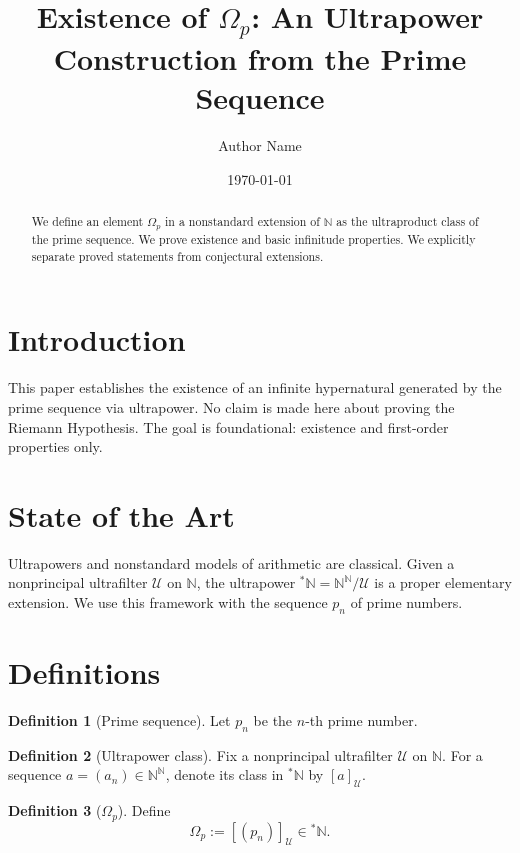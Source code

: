\documentclass[11pt]{article}
\title{Existence of \(\Omega_p\): An Ultrapower Construction from the Prime Sequence}
\author{Author Name}
\date{\today}
\theoremstyle{definition}
\newtheorem{definition}{Definition}[section]
\theoremstyle{plain}
\begin{document}
\maketitle

\begin{abstract}
We define an element \(\Omega_p\) in a nonstandard extension of \(\mathbb N\) as the ultraproduct class of the prime sequence.
We prove existence and basic infinitude properties.
We explicitly separate proved statements from conjectural extensions.
\end{abstract}

\section{Introduction}
This paper establishes the existence of an infinite hypernatural generated by the prime sequence via ultrapower.
No claim is made here about proving the Riemann Hypothesis.
The goal is foundational: existence and first-order properties only.

\section{State of the Art}
Ultrapowers and nonstandard models of arithmetic are classical.
Given a nonprincipal ultrafilter \(\mathcal U\) on \(\mathbb N\), the ultrapower \({}^\ast\mathbb N=\mathbb N^{\mathbb N}/\mathcal U\) is a proper elementary extension.
We use this framework with the sequence \(p_n\) of prime numbers.

\section{Definitions}
\begin{definition}[Prime sequence]
\label{def:prime-seq}
Let \(p_n\) be the \(n\)-th prime number.
\end{definition}

\begin{definition}[Ultrapower class]
\label{def:ultrapower-class}
Fix a nonprincipal ultrafilter \(\mathcal U\) on \(\mathbb N\).
For a sequence \(a=(a_n)\in\mathbb N^{\mathbb N}\), denote its class in \({}^\ast\mathbb N\) by \([a]_{\mathcal U}\).
\end{definition}

\begin{definition}[\(\Omega_p\)]
\label{def:omega-p}
Define
\[
\Omega_p := [(p_n)]_{\mathcal U}\in {}^\ast\mathbb N.
\]
\end{definition}
\end{document}

